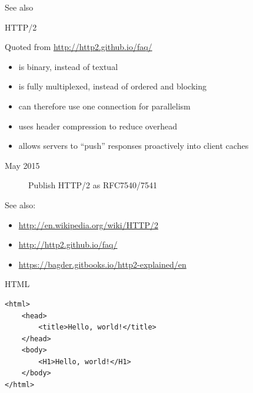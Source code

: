 See also 

\begin{frame}{HTTP/2}
  \begin{block}{Quoted from \url{http://http2.github.io/faq/}}
    \begin{itemize}
    \item is binary, instead of textual
    \item is fully multiplexed, instead of ordered and blocking
    \item can therefore use one connection for parallelism
    \item uses header compression to reduce overhead
    \item allows servers to “push” responses proactively into client caches
    \end{itemize}
  \end{block}
  \begin{description}
  \item[May 2015] Publish HTTP/2 as RFC7540/7541
  \end{description}
\end{frame}

See also:
\begin{itemize}
\item \url{http://en.wikipedia.org/wiki/HTTP/2}
\item \url{http://http2.github.io/faq/}
\item \url{https://bagder.gitbooks.io/http2-explained/en}
\end{itemize}

\begin{frame}[fragile]{HTML}
  \begin{verbatim}
<html>
    <head>
        <title>Hello, world!</title>
    </head>
    <body>
        <H1>Hello, world!</H1>
    </body>
</html>
  \end{verbatim}
\end{frame}

